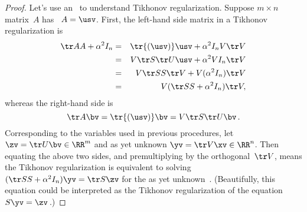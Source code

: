 \begin{proof} 
Let's use an \svd\ to understand Tikhonov regularization.
Suppose \(m\times n\) matrix~\(A\) has \svd\ \(A=\usv\).
First, the left-hand side matrix in a Tikhonov regularization is
\begin{eqnarray*}
\tr AA+\alpha^2I_n
&=&\tr{(\usv)}\usv+\alpha^2I_nV\tr V
\\&=&V\tr S\tr U\usv+\alpha^2VI_n\tr V
\\&=&V\tr SS\tr V+V(\alpha^2I_n)\tr V
\\&=&V(\tr SS+\alpha^2I_n)\tr V,
\end{eqnarray*}
whereas the right-hand side is 
\begin{equation*}
\tr A\bv =\tr{(\usv)}\bv =V\tr S\tr U\bv\,.
\end{equation*}
Corresponding to the variables used in previous procedures, let \(\zv=\tr U\bv\in\RR^m\) and as yet unknown \(\yv=\tr V\xv\in\RR^n\). 
Then equating the above two sides, and premultiplying by the orthogonal~\(\tr V\), means the Tikhonov regularization is equivalent to solving \((\tr SS+\alpha^2I_n)\yv=\tr S\zv\) for the as yet unknown~\yv.
(Beautifully, this equation could be interpreted as the Tikhonov regularization of the equation \(S\yv=\zv\)\,.)


\end{proof}
